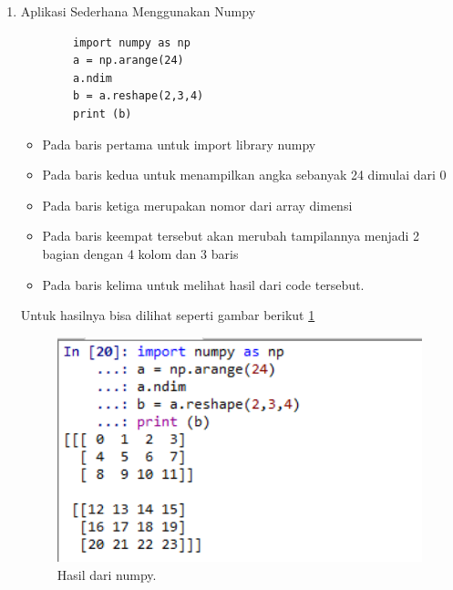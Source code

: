 \begin{enumerate}
\item Aplikasi Sederhana Menggunakan Numpy \par
	\begin{verbatim}
		import numpy as np
		a = np.arange(24)
		a.ndim
		b = a.reshape(2,3,4)
		print (b)
	\end{verbatim}
\begin{itemize}
\item Pada baris pertama untuk import library numpy
\item Pada baris kedua untuk menampilkan angka sebanyak 24 dimulai dari 0
\item Pada baris ketiga merupakan nomor dari array dimensi
\item Pada baris keempat tersebut akan merubah tampilannya menjadi 2 bagian dengan 4 kolom dan 3 baris
\item Pada baris kelima untuk melihat hasil dari code tersebut.
\end{itemize}
Untuk hasilnya bisa dilihat seperti gambar berikut \ref{ron2}
		\begin{figure}[ht]
		\centerline{\includegraphics[width=1\textwidth]{figures/im/ron2.png}}
		\caption{Hasil dari numpy.}
		\label{ron2}
		\end{figure}


\end{enumerate}
